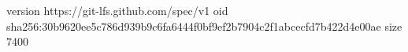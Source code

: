 version https://git-lfs.github.com/spec/v1
oid sha256:30b9620ee5c786d939b9c6fa6444f0bf9ef2b7904c2f1abcecfd7b422d4e00ae
size 7400
